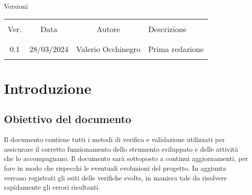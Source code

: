 \documentclass[italian,12pt]{article} %
\begin{document}


\newpage



\captionsetup[table]{list=no}

\begin{table}[!h]
	\begin{center}
		Versioni\\
		\vspace{0.5cm}
		\begin{tabular}{ c c c p{9cm} }
			\hline                                                                                 \\[-2ex]
			Ver. & Data       & Autore             & Descrizione                                   \\
			\\[-2ex] \hline \\[-1.5ex]
			0.1  & 28/03/2024 & Valerio Occhinegro & Prima redazione          					   \\
			\\[-1.5ex] \hline
		\end{tabular}
	\end{center}
\end{table}
\captionsetup[table]{list=yes}

\newpage

\tableofcontents

\newpage

\listoftables

\listoffigures

\newpage

\section{Introduzione}

\subsection{Obiettivo del documento}
Il documento contiene tutti i metodi di verifica e validazione utilizzati
per assicurare il corretto funzionamento dello strumento sviluppato e delle
attività che lo accompagnano.
Il documento sarà sottoposto a continui aggiornamenti, per fare in modo che 
rispecchi le eventuali evoluzioni del progetto.
In aggiunta verrano registrati gli esiti delle verifiche svolte, in maniera tale 
da risolvere rapidamente gli errori risultanti.
\end{document}
